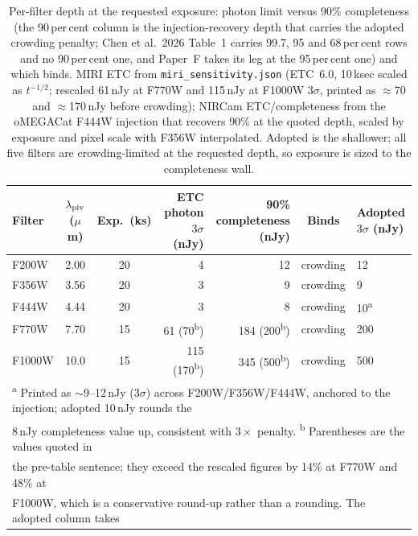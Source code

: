 \documentclass[11pt]{article}
\begin{document}
\begin{table}[htbp]
\centering
\small
\caption{Per-filter depth at the requested exposure: photon limit versus 90\% completeness (the 90\,per\,cent column is the injection-recovery depth that carries the adopted crowding penalty; Chen et al.\ 2026 Table~1 carries 99.7, 95 and 68\,per\,cent rows and no 90\,per\,cent one, and Paper~F takes its leg at the 95\,per\,cent one) and which binds. MIRI ETC from \texttt{miri\_sensitivity.json} (ETC~6.0, 10\,ksec scaled as $t^{-1/2}$; rescaled 61\,nJy at F770W and 115\,nJy at F1000W 3$\sigma$, printed as $\approx$70 and $\approx$170\,nJy before crowding); NIRCam ETC/completeness from the oMEGACat F444W injection that recovers 90\% at the quoted depth, scaled by exposure and pixel scale with F356W interpolated. Adopted is the shallower; all five filters are crowding-limited at the requested depth, so exposure is sized to the completeness wall.}
\label{tab:jwst-perfilter}
\setlength{\tabcolsep}{3pt}
\begin{tabular}{lccrrcl}
\toprule
Filter & $\lambda_{\rm piv}$ ($\mu$m) & Exp.\ (ks) & ETC photon $3\sigma$ (nJy) & 90\% completeness (nJy) & Binds & Adopted $3\sigma$ (nJy) \\
\midrule
F200W  & 2.00 & 20 & 4 & 12 & crowding & 12 \\
F356W  & 3.56 & 20 & 3 & 9 & crowding & 9 \\
F444W  & 4.44 & 20 & 3 & 8 & crowding & 10\textsuperscript{a} \\
F770W  & 7.70 & 15 & 61 (70\textsuperscript{b}) & 184 (200\textsuperscript{b}) & crowding & 200 \\
F1000W & 10.0 & 15 & 115 (170\textsuperscript{b}) & 345 (500\textsuperscript{b}) & crowding & 500 \\
\bottomrule
\multicolumn{7}{l}{\footnotesize \textsuperscript{a} Printed as $\sim$9--12\,nJy (3$\sigma$) across F200W/F356W/F444W, anchored to the injection; adopted 10\,nJy rounds the} \\
\multicolumn{7}{l}{\footnotesize \phantom{\textsuperscript{a}} 8\,nJy completeness value up, consistent with $3\times$ penalty. \textsuperscript{b} Parentheses are the values quoted in} \\
\multicolumn{7}{l}{\footnotesize \phantom{\textsuperscript{a}} the pre-table sentence; they exceed the rescaled figures by 14\% at F770W and 48\% at} \\
\multicolumn{7}{l}{\footnotesize \phantom{\textsuperscript{a}} F1000W, which is a conservative round-up rather than a rounding. The adopted column takes} \\

\end{tabular}
\end{table}
\end{document}

